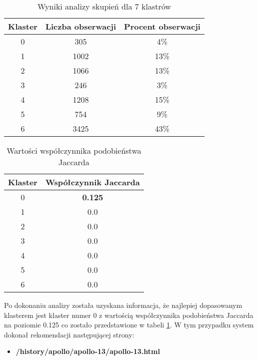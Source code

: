 \documentclass[../EDI_Task3_Karwowski_Kowalewski.tex]{subfiles}
\begin{document}
{{        \begin{table}[!htbp]
            \small
            \centering
            \begin{tabular}{|c|c|c|}
                \hline
                Klaster & Liczba obserwacji & Procent obserwacji \\ \hline
                0 & 305 & 4\% \\
                1 & 1002 & 13\% \\
                2 & 1066 & 13\% \\
                3 & 246 & 3\% \\
                4 & 1208 & 15\% \\
                5 & 754 & 9\% \\
                6 & 3425 & 43\% \\ \hline
            \end{tabular}
            \caption{Wyniki analizy skupień dla 7 klastrów}
        \end{table}

        \begin{table}[!htbp]
            \small
            \centering
            \begin{tabular}{|c|c|}
                \hline
                Klaster & Współczynnik Jaccarda \\ \hline
                0 & \textbf{0.125} \\
                1 & 0.0 \\
                2 & 0.0 \\
                3 & 0.0 \\
                4 & 0.0 \\
                5 & 0.0 \\
                6 & 0.0 \\ \hline
            \end{tabular}
            \caption{Wartości współczynnika podobieństwa Jaccarda}
            \label{coeffcient_7}
        \end{table}
        \FloatBarrier

        Po dokonaniu analizy została uzyskana informacja, że najlepiej dopasowanym
        klasterem jest klaster numer 0 z wartością współczynnika podobieństwa Jaccarda
        na poziomie 0.125 co zostało przedstawione w tabeli \ref{coeffcient_7}. W tym
        przypadku system dokonał rekomendacji następującej strony:
        \begin{itemize}
            \item \textbf{/history/apollo/apollo-13/apollo-13.html}
        \end{itemize}

}}
\end{document}
